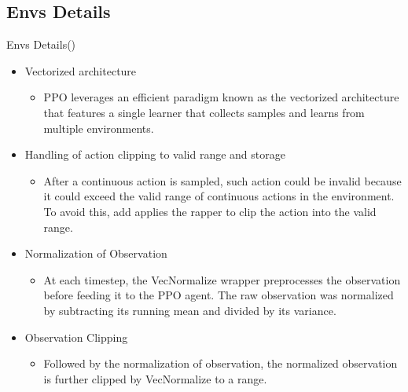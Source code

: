 \documentclass[english, xcolor=dvipsnames, aspectratio=169]{beamer}
\begin{document}

\subsection{Envs Details}
\begin{frame}{Envs Details(\citet{blog})}
\begin{itemize}
        \item Vectorized architecture
        \begin{itemize}
            \item  PPO leverages an efficient paradigm known as the vectorized architecture that features a single learner that collects samples and learns from multiple environments.
        \end{itemize}
    \item Handling of action clipping to valid range and storage
        \begin{itemize}
    \item After a continuous action is sampled, such action could be invalid because it could exceed the valid range of continuous actions in the environment. To avoid this, add applies the rapper to clip the action into the valid range.
    
    \end{itemize}
    
    
    \item Normalization of Observation
    \begin{itemize}
        \item     At each timestep, the VecNormalize wrapper preprocesses the observation before feeding it to the PPO agent. The raw observation was normalized by subtracting its running mean and divided by its variance.
    \end{itemize}

    \item Observation Clipping
    \begin{itemize}
        \item     Followed by the normalization of observation, the normalized observation is further clipped by VecNormalize to a range.
    \end{itemize}

\end{itemize}

\end{frame}
\end{document}

